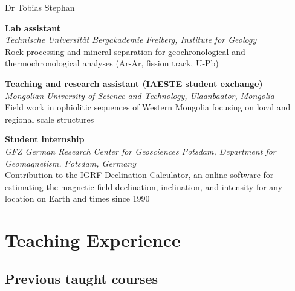 \documentclass[10pt, paper=letter]{scrartcl} %
\begin{document}
\begin{cv}{\textcolor{myred}{\textsf{Dr Tobias Stephan}}}
\begin{cvlist}{}
        \item[2009--2013] \textbf{Lab assistant}\\
        \textit{Technische Universit\"at Bergakademie Freiberg, Institute for Geology}\\ Rock processing and mineral separation for geochronological and thermochronological analyses (Ar\--Ar, fission track, U\--Pb)
        \item[2011/07--2011/09] \textbf{Teaching and research assistant (IAESTE student exchange)}\\
        \textit{Mongolian University of Science and Technology, Ulaanbaator, Mongolia}\\ Field work in ophiolitic sequences of Western Mongolia focusing on local and regional scale structures

        \item[2007/05--2007/06] \textbf{Student internship}\\
        \textit{GFZ German Research Center for Geosciences  Potsdam, Department for Geomagnetism, Potsdam, Germany}\\
        Contribution to the \href{http://isdc.gfz-potsdam.de/igrf-declination-calculator/}{IGRF Declination Calculator}, an online software for estimating the magnetic field declination, inclination, and intensity for any location on Earth and times since 1990
    \end{cvlist}

    \section{Teaching Experience}
    \subsection{Previous taught courses}


\end{cv}
\end{document}
